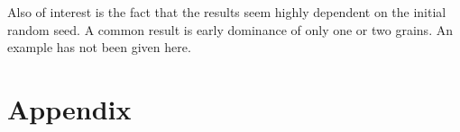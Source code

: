 \documentclass{report}
\begin{document}
        Also of interest is the fact that the results seem highly dependent on the initial random seed. A common result is early dominance of only one or two grains.  An example has not been given here.





    \section{Appendix}
    \begin{figure}[!htb]
        \label{fig:high_temp}
\end{figure}
\end{document}
